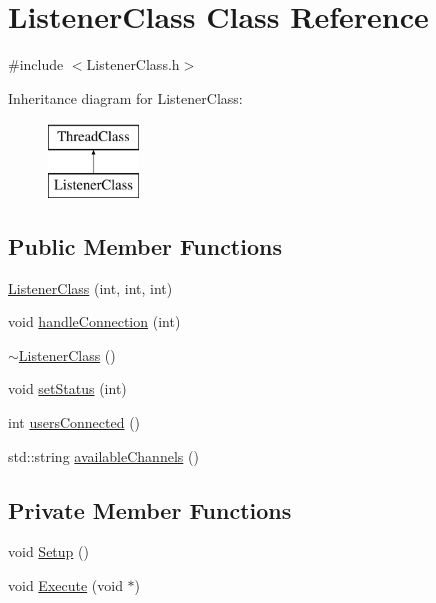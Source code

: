 \hypertarget{classListenerClass}{\section{\-Listener\-Class \-Class \-Reference}
\label{classListenerClass}
}


{\ttfamily \#include $<$\-Listener\-Class.\-h$>$}

\-Inheritance diagram for \-Listener\-Class\-:\begin{figure}[H]
\begin{center}
\leavevmode
\includegraphics[height=2.000000cm]{classListenerClass}
\end{center}
\end{figure}
\subsection*{\-Public \-Member \-Functions}
\begin{DoxyCompactItemize}
\item 
\hyperlink{classListenerClass_a51123fb7fefe03fb4dcd347fab7d53e9}{\-Listener\-Class} (int, int, int)
\item 
void \hyperlink{classListenerClass_a1ea748a7a3d2af97032cb54879937a7b}{handle\-Connection} (int)
\item 
\hyperlink{classListenerClass_ad6ca9ef2ec7d0f5dc1c41c629b62ad62}{$\sim$\-Listener\-Class} ()
\item 
void \hyperlink{classListenerClass_a928179045e95f0b175ce895dbb8cbafd}{set\-Status} (int)
\item 
int \hyperlink{classListenerClass_a2af2bac82ab30eda5ef876e6f4c04df1}{users\-Connected} ()
\item 
std\-::string \hyperlink{classListenerClass_a7d698e794f88524ceb2a01f7b8885431}{available\-Channels} ()
\end{DoxyCompactItemize}
\subsection*{\-Private \-Member \-Functions}
\begin{DoxyCompactItemize}
\item 
void \hyperlink{classListenerClass_a3c03db442f150655fb00cc5b562f4cc8}{\-Setup} ()
\item 
void \hyperlink{classListenerClass_ac8dd8fe72b34ab5412f8ffe1fec18808}{\-Execute} (void $\ast$)
\end{DoxyCompactItemize}
